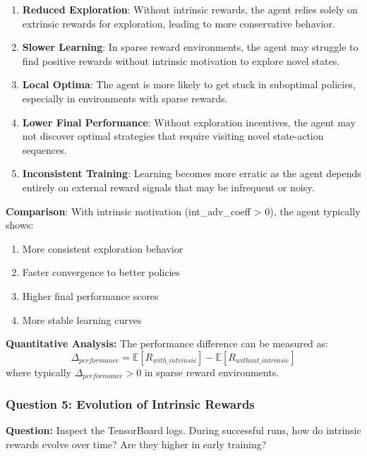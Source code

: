 \documentclass[12pt]{article}
\begin{document}
{{{\begin{enumerate}
    \item \textbf{Reduced Exploration}: Without intrinsic rewards, the agent relies solely on extrinsic rewards for exploration, leading to more conservative behavior.
    
    \item \textbf{Slower Learning}: In sparse reward environments, the agent may struggle to find positive rewards without intrinsic motivation to explore novel states.
    
    \item \textbf{Local Optima}: The agent is more likely to get stuck in suboptimal policies, especially in environments with sparse rewards.
    
    \item \textbf{Lower Final Performance}: Without exploration incentives, the agent may not discover optimal strategies that require visiting novel state-action sequences.
    
    \item \textbf{Inconsistent Training}: Learning becomes more erratic as the agent depends entirely on external reward signals that may be infrequent or noisy.
\end{enumerate}

\textbf{Comparison}: With intrinsic motivation (int\_adv\_coeff > 0), the agent typically shows:
\begin{enumerate}
    \item More consistent exploration behavior
    \item Faster convergence to better policies
    \item Higher final performance scores
    \item More stable learning curves
\end{enumerate}

\textbf{Quantitative Analysis:} The performance difference can be measured as:
\begin{equation}
\Delta_{performance} = \mathbb{E}[R_{with\_intrinsic}] - \mathbb{E}[R_{without\_intrinsic}]
\end{equation}
where typically $\Delta_{performance} > 0$ in sparse reward environments.

\subsubsection{Question 5: Evolution of Intrinsic Rewards}

\textbf{Question:} Inspect the TensorBoard logs. During successful runs, how do intrinsic rewards evolve over time? Are they higher in early training?

}}}
\end{document}
